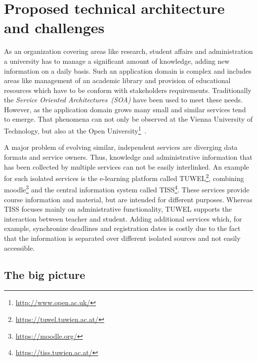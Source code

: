 \section{Proposed technical architecture and challenges}
As an organization covering areas like research, student affairs and administration a university has to manage a significant amount of knowledge, adding new information on a daily basis.
Such an application domain is complex and includes areas like management of an academic library and provision of educational resources which have to be conform with stakeholders requirements. Traditionally the \textit{Service Oriented Architectures~(SOA)} have been used to meet these needs. However, as the application domain grows many small and similar services tend to emerge. That phenomena can not only be observed at the Vienna University of Technology, but also at the Open University\footnote{\url{http://www.open.ac.uk/}}~\citet{inproceedings:zablith_consuming_2011}.

A major problem of evolving similar, independent services are diverging data formats and service owners. Thus, knowledge and administrative information that has been collected by multiple services can not be easily interlinked. An example for such isolated services is the e-learning platform called TUWEL\footnote{\url{https://tuwel.tuwien.ac.at/}}, combining moodle\footnote{\url{https://moodle.org/}} and the central information system called TISS\footnote{\url{https://tiss.tuwien.ac.at/}}. These services provide course information and material, but are intended for different purposes. Whereas TISS focuses mainly on administrative functionality, TUWEL supports the interaction between teacher and student. 
Adding additional services which, for example, synchronize deadlines and registration dates is costly due to the fact that the information is separated over different isolated sources and not easily accessible. 

\subsection{The big picture}

